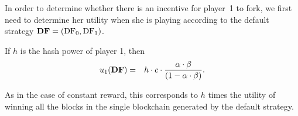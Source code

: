 In order to determine whether there is an incentive for player~1 to fork, we first need to determine her utility when she is playing according to the default strategy $\text{\rm {\bf DF}} = (\text{\rm DF}_0,\text{\rm DF}_1)$. 

\begin{lemma}\label{lem:default_utility}
If $h$ is the hash power of player 1, then
\begin{eqnarray*}
u_1(\text{\rm {\bf DF}}) & = & h\cdot c\cdot\frac{\alpha\cdot\beta}{(1-\alpha\cdot\beta)}.
\end{eqnarray*}
\end{lemma}
As in the case of constant reward, this corresponds to $h$ times the utility of winning all the blocks in the single blockchain generated by the default strategy.



